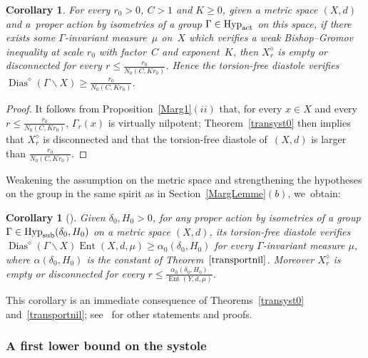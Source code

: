 \documentclass[pdftex]{sigma}
\numberwithin{equation}{section}
\newtheorem{Corollary}[theor]{Corollary}
\newcommand{\Ent}{\operatorname{Ent}}
\newcommand{\dias}{\operatorname{Dias}}
\begin{document}
\begin{Corollary}\label{transyst1}
For every $r_0 >0$, $C > 1 $ and $K\ge 0$, given a metric space $(X,d)$ and a~proper action by isometries of a group
$\Gamma \in \text{\rm Hyp}_{\rm act}$ on this space, if there exists some
$\Gamma$-invariant measure~$\mu$ on~$X$ which verifies a weak Bishop--Gromov inequality at scale $r_0$ with factor~$C$ and exponent~$K$, then $X^{\diamond}_{r}$ is empty or disconnected for every $r \le \frac{r_0}{N_0 (C, Kr_0)}$. Hence
the torsion-free diastole verifies $\dias^{\diamond} (\Gamma \backslash X) \ge \frac{r_0}{N_0 (C, Kr_0)}$.
\end{Corollary}

\begin{proof} It follows from Proposition~\ref{Marg1}$(ii)$ that, for every $x \in X$ and every $r \le \frac{r_0}{N_0 (C, Kr_0)}$, $\Gamma_{r} (x)$ is virtually
nilpotent; Theorem~\ref{transyst0} then implies that $X^{\diamond}_{r}$ is disconnected and that the torsion-free diastole of~$(X,d)$ is larger than
$\frac{r_0}{N_0 (C, Kr_0)} $.
\end{proof}

Weakening the assumption on the metric space and strengthening the hypotheses on the group in the same spirit as in Section~\ref{MargLemme}$(b)$, we~obtain:

\begin{Corollary}[{\cite[Theorem~6.15(ii)]{BCGS}}]\label{transyst2}
Given $\delta_0, H_0 > 0$, for any proper action by isometries of a group
$\Gamma \in \text{\rm Hyp}_{\rm sub} (\delta_0, H_0)$ on
a metric space $ (X, d) $, its torsion-free diastole verifies $\dias^{\diamond} (\Gamma \backslash X) \Ent (X, d, \mu) \ge \alpha_0 (\delta_0, H_0)$
for every $\Gamma$-invariant measure $\mu$, where $\alpha (\delta_0, H_0)$ is the constant of Theorem~$\ref{transportnil}$.
Moreover $X^{\diamond}_{r}$ is empty or disconnected for every $r \le \frac{\alpha_0 (\delta_0, H_0)}{\Ent (Y,d, \mu)}$.
\end{Corollary}
This corollary is an immediate consequence of Theorems~\ref{transyst0} and~\ref{transportnil}; see~\cite[Section~6.3]{BCGS} for other statements
and proofs.

\subsubsection{A first lower bound on the systole}\label{systolebound1}
\end{document}
